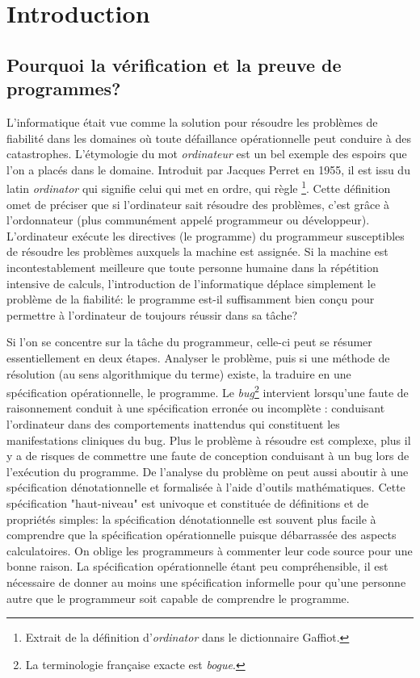 \chapter{Introduction}

\section{Pourquoi la vérification et la preuve de programmes?}

L'informatique était vue comme la solution pour résoudre les problèmes de
fiabilité dans les domaines où toute défaillance 
opérationnelle peut conduire à des catastrophes. L'étymologie du mot {\em ordinateur}
est un bel exemple des espoirs que l'on a placés dans le domaine. Introduit par Jacques Perret
en 1955, il est issu du latin {\em ordinator} qui signifie celui qui met en ordre, qui règle
\footnote{\footnotesize Extrait de la définition d'{\em ordinator} dans le dictionnaire Gaffiot.}.
Cette définition omet de préciser que si l'ordinateur sait résoudre des problèmes, c'est 
grâce à l'ordonnateur (plus communément appelé programmeur ou développeur). %
L'ordinateur exécute les directives (le programme) du programmeur susceptibles de résoudre
les problèmes auxquels la machine est assignée. 
Si la machine est incontestablement meilleure que toute personne humaine dans la répétition 
intensive de calculs, l'introduction de l'informatique déplace simplement le problème 
de la fiabilité: le programme est-il suffisamment bien conçu pour permettre à l'ordinateur
de toujours réussir dans sa tâche? 

Si l'on se concentre sur la tâche du programmeur, celle-ci peut se résumer essentiellement
en deux étapes. Analyser le problème, puis si une méthode de résolution (au sens algorithmique du terme) existe,
la traduire en une spécification opérationnelle, le programme. Le {\em bug}\footnote{\footnotesize
  La terminologie française exacte est {\em bogue}.} intervient lorsqu'une faute 
de raisonnement conduit à une spécification erronée ou incomplète : conduisant l'ordinateur 
dans des comportements inattendus qui constituent les manifestations cliniques du bug.
Plus le problème à résoudre est complexe, plus il y a de risques de commettre une faute 
de conception conduisant à un bug lors de l'exécution du programme. 
De l'analyse du problème on peut aussi aboutir à une spécification dénotationnelle et formalisée à l'aide d'outils mathématiques.
Cette spécification "haut-niveau" est univoque et constituée de définitions et de propriétés simples:
la spécification dénotationnelle est souvent plus facile à comprendre que la spécification opérationnelle puisque 
débarrassée des aspects calculatoires.
On oblige les programmeurs à commenter leur code source pour une bonne raison. La spécification opérationnelle
étant peu compréhensible, il est nécessaire de donner au moins une spécification informelle pour qu'une personne autre
que le programmeur soit capable de comprendre le programme.

